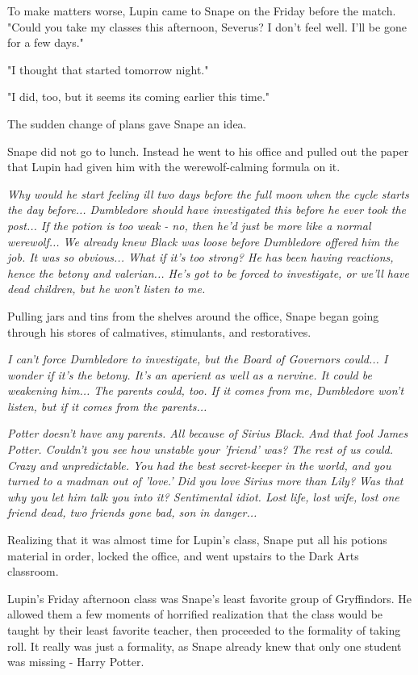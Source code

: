 \documentclass[a4paper,11pt]{article}
\begin{document}
To make matters worse, Lupin came to Snape on the Friday before the match. "Could you take my classes this afternoon, Severus? I don't feel well. I'll be gone for a few days."

"I thought that started tomorrow night."

"I did, too, but it seems its coming earlier this time."

The sudden change of plans gave Snape an idea.

Snape did not go to lunch. Instead he went to his office and pulled out the paper that Lupin had given him with the werewolf-calming formula on it.

\emph{Why would he start feeling ill two days before the full moon when the cycle starts the day before... Dumbledore should have investigated this before he ever took the post... If the potion is too weak - no, then he'd just be more like a normal werewolf... We already knew Black was loose before Dumbledore offered him the job. It was so obvious... What if it's too strong? He has been having reactions, hence the betony and valerian... He's got to be forced to investigate, or we'll have dead children, but he won't listen to me.}

Pulling jars and tins from the shelves around the office, Snape began going through his stores of calmatives, stimulants, and restoratives.

\emph{I can't force Dumbledore to investigate, but the Board of Governors could... I wonder if it's the betony. It's an aperient as well as a nervine. It could be weakening him... The parents could, too. If it comes from me, Dumbledore won't listen, but if it comes from the parents...}

\emph{Potter doesn't have any parents. All because of Sirius Black. And that fool James Potter. Couldn't you see how unstable your 'friend' was? The rest of us could. Crazy and unpredictable. You had the best secret-keeper in the world, and you turned to a madman out of 'love.' Did you love Sirius more than Lily? Was that why you let him talk you into it? Sentimental idiot. Lost life, lost wife, lost one friend dead, two friends gone bad, son in danger...}

Realizing that it was almost time for Lupin's class, Snape put all his potions material in order, locked the office, and went upstairs to the Dark Arts classroom.

Lupin's Friday afternoon class was Snape's least favorite group of Gryffindors. He allowed them a few moments of horrified realization that the class would be taught by their least favorite teacher, then proceeded to the formality of taking roll. It really was just a formality, as Snape already knew that only one student was missing - Harry Potter.
\end{document}
